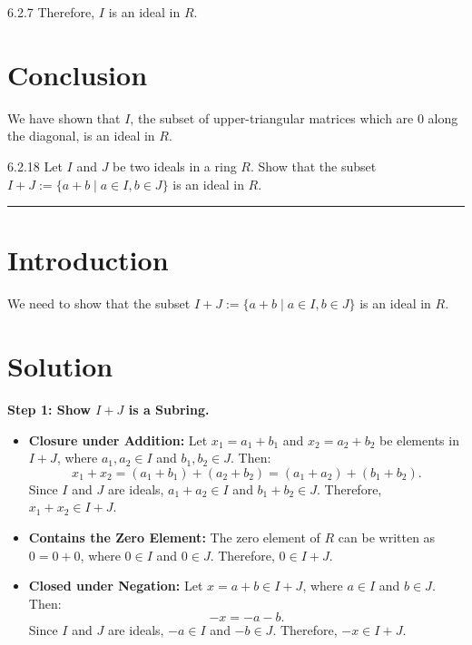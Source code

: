 \documentclass[12pt]{amsart}
\theoremstyle{definition}
\numberwithin{equation}{section}
\begin{document}
\begin{exercise}{6.2.7}
    Therefore, \(I\) is an ideal in \(R\).

    \section*{Conclusion}
    We have shown that \(I\), the subset of upper-triangular matrices which are 0 along the diagonal, is an ideal in \(R\).

\end{exercise}
\newpage
\begin{exercise}{6.2.18} Let \(I\) and \(J\) be two ideals in a ring \(R\). Show that the subset \(I+J := \{a+b \mid a \in I, b \in J\} \) is an ideal in \(R\).

    \noindent\rule{\linewidth}{1pt}

    \section*{Introduction}
    We need to show that the subset \(I+J := \{a + b \mid a \in I, b \in J\} \) is an ideal in \(R\).

    \section*{Solution}
    \noindent \textbf{Step 1: Show \(I + J\) is a Subring.}

    \begin{itemize}
        \item \textbf{Closure under Addition:}
        Let \(x_1 = a_1 + b_1\) and \(x_2 = a_2 + b_2\) be elements in \(I + J\), where \(a_1, a_2 \in I\) and \(b_1, b_2 \in J\). Then:
        \[
        x_1 + x_2 = (a_1 + b_1) + (a_2 + b_2) = (a_1 + a_2) + (b_1 + b_2).
        \]
        Since \(I\) and \(J\) are ideals, \(a_1 + a_2 \in I\) and \(b_1 + b_2 \in J\). Therefore, \(x_1 + x_2 \in I + J\).

        \item \textbf{Contains the Zero Element:}
        The zero element of \(R\) can be written as \(0 = 0 + 0\), where \(0 \in I\) and \(0 \in J\). Therefore, \(0 \in I + J\).

        \item \textbf{Closed under Negation:}
        Let \(x = a + b \in I + J\), where \(a \in I\) and \(b \in J\). Then:
        \[
        -x = -a - b.
        \]
        Since \(I\) and \(J\) are ideals, \(-a \in I\) and \(-b \in J\). Therefore, \(-x \in I + J\).
    \end{itemize}


\end{exercise}
\end{document}
